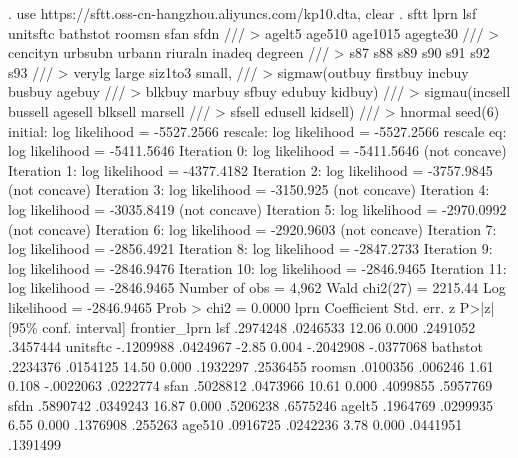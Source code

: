 . use https://sftt.oss-cn-hangzhou.aliyuncs.com/kp10.dta, clear
{\smallskip}
. sftt lprn lsf unitsftc bathstot roomsn sfan sfdn          ///
>           agelt5 age510 age1015 agegte30                  ///
>           cencityn urbsubn urbann riuraln inadeq degreen  ///
>           s87 s88 s89 s90 s91 s92 s93                     ///
>           verylg large siz1to3 small,                     ///
>      sigmaw(outbuy firstbuy incbuy busbuy agebuy          ///
>             blkbuy marbuy sfbuy edubuy kidbuy)            ///
>      sigmau(incsell bussell agesell blksell marsell       ///
>             sfsell edusell kidsell)                       ///
>      hnormal seed(6)
{\smallskip}
initial:       log likelihood = -5527.2566
rescale:       log likelihood = -5527.2566
rescale eq:    log likelihood = -5411.5646
Iteration 0:   log likelihood = -5411.5646  (not concave)
Iteration 1:   log likelihood = -4377.4182  
Iteration 2:   log likelihood = -3757.9845  (not concave)
Iteration 3:   log likelihood =  -3150.925  (not concave)
Iteration 4:   log likelihood = -3035.8419  (not concave)
Iteration 5:   log likelihood = -2970.0992  (not concave)
Iteration 6:   log likelihood = -2920.9603  (not concave)
Iteration 7:   log likelihood = -2856.4921  
Iteration 8:   log likelihood = -2847.2733  
Iteration 9:   log likelihood = -2846.9476  
Iteration 10:  log likelihood = -2846.9465  
Iteration 11:  log likelihood = -2846.9465  
{\smallskip}
{}
{\smallskip}
                                                       Number of obs =   4,962
                                                       Wald chi2(27) = 2215.44
Log likelihood = -2846.9465                            Prob > chi2   =  0.0000
{\smallskip}
         lprn {\VBAR} Coefficient  Std. err.      z    P>|z|     [95\% conf. interval]
frontier_lprn {\VBAR}
          lsf {\VBAR}   .2974248   .0246533    12.06   0.000     .2491052    .3457444
     unitsftc {\VBAR}  -.1209988   .0424967    -2.85   0.004    -.2042908   -.0377068
     bathstot {\VBAR}   .2234376   .0154125    14.50   0.000     .1932297    .2536455
       roomsn {\VBAR}   .0100356    .006246     1.61   0.108    -.0022063    .0222774
         sfan {\VBAR}   .5028812   .0473966    10.61   0.000     .4099855    .5957769
         sfdn {\VBAR}   .5890742   .0349243    16.87   0.000     .5206238    .6575246
       agelt5 {\VBAR}   .1964769   .0299935     6.55   0.000     .1376908     .255263
       age510 {\VBAR}   .0916725   .0242236     3.78   0.000     .0441951    .1391499
